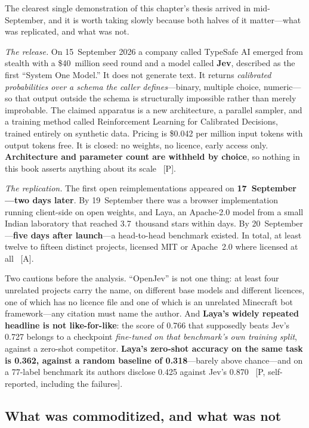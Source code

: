 The clearest single demonstration of this chapter's thesis arrived in mid-September, and it is worth taking slowly because both halves of it matter---what was replicated, and what was not.

\emph{The release.} On 15~September 2026 a company called TypeSafe AI emerged from stealth with a \$40~million seed round and a model called \textbf{Jev}, described as the first ``System One Model.'' It does not generate text. It returns \emph{calibrated probabilities over a schema the caller defines}---binary, multiple choice, numeric---so that output outside the schema is structurally impossible rather than merely improbable. The claimed apparatus is a new architecture, a parallel sampler, and a training method called Reinforcement Learning for Calibrated Decisions, trained entirely on synthetic data. Pricing is \$0.042 per million input tokens with output tokens free. It is closed: no weights, no licence, early access only. \textbf{Architecture and parameter count are withheld by choice}, so nothing in this book asserts anything about its scale~\cite{jev} [P].

\emph{The replication.} The first open reimplementations appeared on \textbf{17~September---two days later}. By 19~September there was a browser implementation running client-side on open weights, and Laya, an Apache-2.0 model from a small Indian laboratory that reached 3.7~thousand stars within days. By 20~September---\textbf{five days after launch}---a head-to-head benchmark existed. In total, at least twelve to fifteen distinct projects, licensed MIT or Apache~2.0 where licensed at all~\cite{jev-replications} [A].

Two cautions before the analysis. ``OpenJev'' is not one thing: at least four unrelated projects carry the name, on different base models and different licences, one of which has no licence file and one of which is an unrelated Minecraft bot framework---any citation must name the author. And \textbf{Laya's widely repeated headline is not like-for-like}: the score of 0.766 that supposedly beats Jev's 0.727 belongs to a checkpoint \emph{fine-tuned on that benchmark's own training split}, against a zero-shot competitor. \textbf{Laya's zero-shot accuracy on the same task is 0.362, against a random baseline of 0.318}---barely above chance---and on a 77-label benchmark its authors disclose 0.425 against Jev's 0.870~\cite{laya} [P, self-reported, including the failures].

\subsection{What was commoditized, and what was not}

